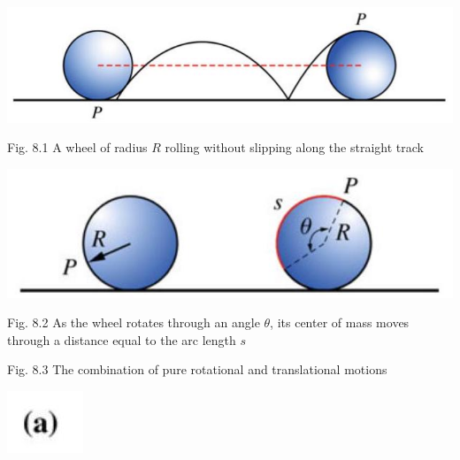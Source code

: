 \documentclass[10pt]{article}
\begin{document}
\begin{center}
\includegraphics[max width=\textwidth]{2024_09_13_db1f357d2aad0a03eb2eg-131(1)}
\end{center}

Fig. 8.1 A wheel of radius $R$ rolling without slipping along the straight track

\begin{center}
\includegraphics[max width=\textwidth]{2024_09_13_db1f357d2aad0a03eb2eg-131}
\end{center}

Fig. 8.2 As the wheel rotates through an angle $\theta$, its center of mass moves through a distance equal to the arc length $s$

Fig. 8.3 The combination of pure rotational and translational motions

\begin{center}
\includegraphics[max width=\textwidth]{2024_09_13_db1f357d2aad0a03eb2eg-132(2)}
\end{center}
\end{document}
